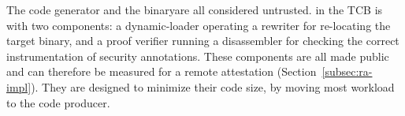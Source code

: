 


\DIFdelbegin %
\textbf{}%
\DIFdelend The code generator and the binary\DIFdelbegin {}\DIFdelend \DIFaddbegin {}\DIFaddend are all considered untrusted. \DIFdelbegin {}\DIFdelend \DIFaddbegin {}\DIFaddend in the TCB is \DIFdelbegin {}\DIFdelend with two components: a dynamic-loader operating a rewriter for re-locating the target binary, and a proof verifier running a disassembler for checking the correct instrumentation of security annotations. These components are all made public and can therefore be measured for a remote attestation (Section~\ref{subsec:ra-impl}). They are designed to minimize their code size, by moving most workload to the code producer. 




